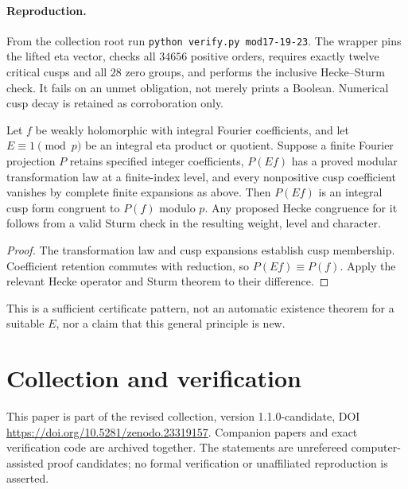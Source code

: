 \documentclass[11pt]{article}
\theoremstyle{remark}\newtheorem{remark}[theorem]{Remark}
\begin{document}
\paragraph{Reproduction.}
From the collection root run \texttt{python verify.py mod17-19-23}. The wrapper pins the lifted eta vector, checks all $34656$ positive orders, requires exactly twelve critical cusps and all $28$ zero groups, and performs the inclusive Hecke--Sturm check. It fails on an unmet obligation, not merely prints a Boolean. Numerical cusp decay is retained as corroboration only.

\begin{proposition}
Let $f$ be weakly holomorphic with integral Fourier coefficients, and let $E\equiv1\pmod p$ be an integral eta product or quotient. Suppose a finite Fourier projection $P$ retains specified integer coefficients, $P(Ef)$ has a proved modular transformation law at a finite-index level, and every nonpositive cusp coefficient vanishes by complete finite expansions as above. Then $P(Ef)$ is an integral cusp form congruent to $P(f)$ modulo $p$. Any proposed Hecke congruence for it follows from a valid Sturm check in the resulting weight, level and character.
\end{proposition}
\begin{proof} The transformation law and cusp expansions establish cusp membership. Coefficient retention commutes with reduction, so $P(Ef)\equiv P(f)$. Apply the relevant Hecke operator and Sturm theorem to their difference.\end{proof}
This is a sufficient certificate pattern, not an automatic existence theorem for a suitable $E$, nor a claim that this general principle is new.

\section*{Collection and verification}
This paper is part of the revised collection, version 1.1.0-candidate, DOI \url{https://doi.org/10.5281/zenodo.23319157}. Companion papers and exact verification code are archived together. The statements are unrefereed computer-assisted proof candidates; no formal verification or unaffiliated reproduction is asserted.
\end{document}

